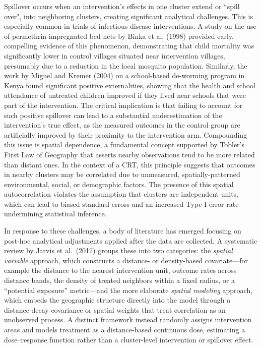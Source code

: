 \documentclass{article}[11pt]
\begin{document}
Spillover occurs when an intervention's effects in one cluster extend or ``spill over", into neighboring clusters, creating significant analytical challenges\cite{anayaizquierdo_spatial_2021}\cite{jarvis_spatial_2017}. This is especially common in trials of infectious disease interventions. A study on the use of permethrin-impregnated bed nets by Binka et al. (1998) provided early, compelling evidence of this phenomenon, demonstrating that child mortality was significantly lower in control villages situated near intervention villages, presumably due to a reduction in the local mosquito population\cite{binka_impact_1998}\cite{gimnig_effect_2003}\cite{hawley_community-wide_2003}. Similarly, the work by Miguel and Kremer (2004) on a school-based de-worming program in Kenya found significant positive externalities, showing that the health and school attendance of untreated children improved if they lived near schools that were part of the intervention\cite{miguel_worms_2004}. The critical implication is that failing to account for such positive spillover can lead to a substantial underestimation of the intervention's true effect, as the measured outcomes in the control group are artificially improved by their proximity to the intervention arm. Compounding this issue is spatial dependence, a fundamental concept supported by Tobler's First Law of Geography that asserts nearby observations tend to be more related than distant ones\cite{jarvis_spatial_2017}\cite{tobler_computer_1970}. In the context of a CRT, this principle suggests that outcomes in nearby clusters may be correlated due to unmeasured, spatially-patterned environmental, social, or demographic factors. The presence of this spatial autocorrelation violates the assumption that clusters are independent units, which can lead to biased standard errors and an increased Type I error rate undermining statistical inference\cite{getis_history_2008}\cite{cressie_statistics_1993}\cite{tobler_computer_1970}.

In response to these challenges, a body of literature has emerged focusing on post-hoc analytical adjustments applied after the data are collected. A systematic review by Jarvis et al.\ (2017) groups these into two categories\cite{jarvis_spatial_2017}: the \emph{spatial variable} approach, which constructs a distance- or density-based covariate---for example the distance to the nearest intervention unit\cite{hawley_community-wide_2003}\cite{gimnig_effect_2003}, outcome rates across distance bands\cite{binka_impact_1998}, the density of treated neighbors within a fixed radius\cite{miguel_worms_2004}\cite{lenhart_insecticidetreated_2008}, or a ``potential exposure'' metric\cite{chao_contribution_2015}---and the more elaborate \emph{spatial modeling} approach, which embeds the geographic structure directly into the model through a distance-decay covariance\cite{alexander_spatial_2003} or spatial weights that treat correlation as an unobserved process\cite{silcocks_spatial_2010}. A distinct framework instead randomly assigns intervention areas and models treatment as a distance-based continuous dose, estimating a dose--response function rather than a cluster-level intervention or spillover effect\cite{watson_design_2025}.
\end{document}
